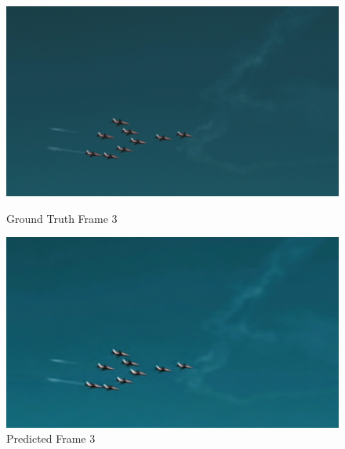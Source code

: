 \documentclass{ioereport}
\begin{document}
    \begin{figure}[H]
    \centering
    \begin{minipage}{0.45\textwidth}
        \centering
        \includegraphics[width=\linewidth]{assets/video_results/im3.png}
        \caption{Ground Truth Frame 3}
        \label{fig:gt-frame-3}
    \end{minipage}\hfill
    \begin{minipage}{0.45\textwidth}
        \centering
        \includegraphics[width=\linewidth]{assets/video_results/pred2.png}
        \caption{Predicted Frame 3}
        \label{fig:pred-frame-3}
    \end{minipage}
\end{figure}
\end{document}
